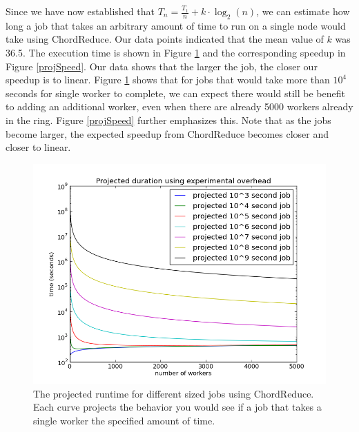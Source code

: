 \documentclass[10pt, conference, compsocconf]{IEEEtran}
\begin{document}

Since we have now established that $T_{n} = \frac{T_{1}}{n} + k \cdot \log_{2}(n)$, we can estimate how long a job that takes an arbitrary amount of time to run on a single node would take using ChordReduce.  Our data points indicated that the mean value of  $k$ was 36.5. The execution time is shown in Figure \ref{projTime} and the corresponding speedup in Figure \ref{projSpeed}.
Our data shows that the larger the job, the closer our speedup is to linear.  Figure \ref{projTime} shows that for jobs that would take more than $10^{4}$ seconds for single worker to complete, we can expect there would still be benefit to adding an additional worker, even when there are already 5000 workers already in the ring.  Figure \ref{projSpeed} further emphasizes this. Note that as the jobs become larger, the expected speedup from ChordReduce becomes closer and closer to linear.


\begin{figure}
    \includegraphics[width=\linewidth]{projTime}
    \caption{The projected runtime for different sized jobs using ChordReduce.  Each curve projects the behavior you would see if a job that takes a single worker the specified amount of time.}
    \label{projTime}
\end{figure}
\end{document}
